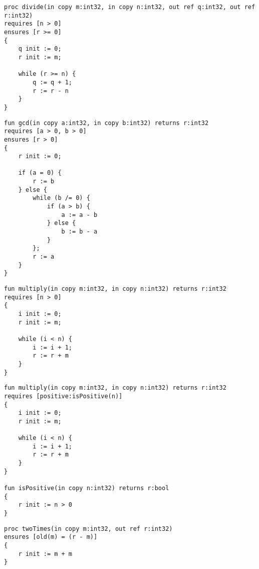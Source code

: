 
\begin{lstlisting}[caption=Pre-/postconditions in Prozeduren]
proc divide(in copy m:int32, in copy n:int32, out ref q:int32, out ref r:int32)
requires [n > 0]
ensures [r >= 0]
{
    q init := 0;
    r init := m;

    while (r >= n) {
        q := q + 1;
        r := r - n
    }
}
\end{lstlisting}

\begin{lstlisting}[caption=Pre-/postconditions in Funktionen mit mehreren Conditions]
fun gcd(in copy a:int32, in copy b:int32) returns r:int32
requires [a > 0, b > 0]
ensures [r > 0]
{
    r init := 0;
    
    if (a = 0) {
        r := b
    } else {
        while (b /= 0) {
            if (a > b) {
                a := a - b
            } else {
                b := b - a
            }
        };
        r := a
    }
}
\end{lstlisting}

\begin{lstlisting}[caption=Pre-/postconditions in Funktionen]
fun multiply(in copy m:int32, in copy n:int32) returns r:int32
requires [n > 0]
{
    i init := 0;
    r init := m;

    while (i < n) {
        i := i + 1;
        r := r + m
    }
}
\end{lstlisting}

\begin{lstlisting}[caption=Pre-/postconditions mit Funktion in der Condition List]
fun multiply(in copy m:int32, in copy n:int32) returns r:int32
requires [positive:isPositive(n)]
{
    i init := 0;
    r init := m;

    while (i < n) {
        i := i + 1;
        r := r + m
    }
}

fun isPositive(in copy n:int32) returns r:bool
{
    r init := n > 0
}
\end{lstlisting}

\begin{lstlisting}[caption=Pre-/postconditions mit old Funktion]
proc twoTimes(in copy m:int32, out ref r:int32)
ensures [old(m) = (r - m)]
{
    r init := m + m
}
\end{lstlisting}
